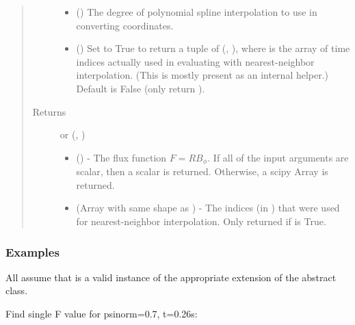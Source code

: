 \documentclass[letterpaper,10pt,english]{sphinxmanual}
\begin{document}
\begin{fulllineitems}
\begin{fulllineitems}
\begin{quote}
\begin{description}
\begin{itemize}
\item {} 
 () \textendash{} The degree of polynomial spline interpolation to
use in converting coordinates.

\item {} 
 () \textendash{} Set to True to return a tuple of (,
), where  is the array of time indices
actually used in evaluating  with nearest-neighbor
interpolation. (This is mostly present as an internal helper.)
Default is False (only return ).

\end{itemize}

\item[{Returns}] \leavevmode

 or (, )
\begin{itemize}
\item {} 
 () - The flux function \(F=RB_{\phi}\).
If all of the input arguments are scalar, then a scalar is returned.
Otherwise, a scipy Array is returned.

\item {} 
 (Array with same shape as ) - The indices
(in ) that were used for
nearest-neighbor interpolation. Only returned if  is
True.

\end{itemize}


\end{description}\end{quote}
\subsubsection*{Examples}

All assume that  is a valid instance of the appropriate
extension of the {\hyperref[\detokenize{eqtools:eqtools.core.Equilibrium}]{}} abstract class.

Find single F value for psinorm=0.7, t=0.26s:

\begin{sphinxVerbatim}[commandchars=\\\{\}]
   
\end{sphinxVerbatim}


\end{fulllineitems}
\end{fulllineitems}
\end{document}
